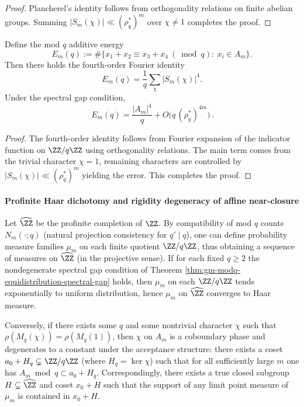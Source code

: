 \begin{proof}
Plancherel's identity follows from orthogonality relations on finite abelian groups.
Summing \(|S_m(\chi)|\ll (\rho_q^\ast)^m\) over \(\chi\ne 1\) completes the proof.
\end{proof}

\begin{proposition}\label{prop:gm-modq-additive-energy-main-error}
Define the mod \(q\) additive energy
\[
E_m(q):=\#\{x_1+x_2\equiv x_3+x_4\ (\bmod q):\ x_i\in A_m\}.
\]
Then there holds the fourth-order Fourier identity
\[
E_m(q)=\frac{1}{q}\sum_{\chi}|S_m(\chi)|^4.
\]
Under the spectral gap condition,
\[
\boxed{\ E_m(q)=\frac{|A_m|^4}{q}+O\!\bigl(q\,(\rho_q^\ast)^{4m}\bigr)\ }.
\]
\end{proposition}

\begin{proof}
The fourth-order identity follows from Fourier expansion of the indicator function on \(\ZZ/q\ZZ\) using orthogonality relations.
The main term comes from the trivial character \(\chi=1\), remaining characters are controlled by \(|S_m(\chi)|\ll (\rho_q^\ast)^m\) yielding the error. This completes the proof.
\end{proof}

\paragraph{Profinite Haar dichotomy and rigidity degeneracy of affine near-closure}
\begin{theorem}\label{thm:gm-profinite-haar-dichotomy}
Let \(\widehat{\ZZ}\) be the profinite completion of \(\ZZ\).
By compatibility of mod \(q\) counts \(N_m(\cdot;q)\) (natural projection consistency for \(q'\mid q\)), one can define probability measure families \(\mu_m\) on each finite quotient \(\ZZ/q\ZZ\), thus obtaining a sequence of measures on \(\widehat{\ZZ}\) (in the projective sense).
If for each fixed \(q\ge 2\) the nondegenerate spectral gap condition of Theorem \ref{thm:gm-modq-equidistribution-spectral-gap} holds, then \(\mu_m\) on each \(\ZZ/q\ZZ\) tends exponentially to uniform distribution, hence \(\mu_m\) on \(\widehat{\ZZ}\) converges to Haar measure.
\par
Conversely, if there exists some \(q\) and some nontrivial character \(\chi\) such that \(\rho(M_q(\chi))=\rho(M_q(1))\), then \(\chi\) on \(A_m\) is a coboundary phase and degenerates to a constant under the acceptance structure: there exists a coset \(a_0+H_q\subsetneq \ZZ/q\ZZ\) (where \(H_q=\ker\chi\)) such that for all sufficiently large \(m\) one has \(A_m\bmod q\subset a_0+H_q\).
Correspondingly, there exists a true closed subgroup \(H\subsetneq \widehat{\ZZ}\) and coset \(x_0+H\) such that the support of any limit point measure of \(\mu_m\) is contained in \(x_0+H\).
\end{theorem}

